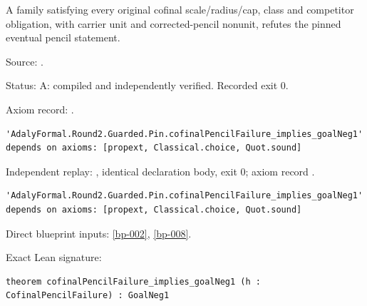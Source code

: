 \begin{theorem}[bp-245]
\label{bp-245}
\leanok
A family satisfying every original cofinal scale/radius/cap, class and competitor obligation, with carrier unit and corrected-pencil nonunit, refutes the pinned eventual pencil statement.

\par Source: \texttt{}.
\par Status: A: compiled and independently verified. Recorded exit 0.
\par Axiom record: \texttt{}.
\begin{verbatim}
'AdalyFormal.Round2.Guarded.Pin.cofinalPencilFailure_implies_goalNeg1' depends on axioms: [propext, Classical.choice, Quot.sound]
\end{verbatim}
\par Independent replay: \texttt{}, identical declaration body, exit 0; axiom record \texttt{}.
\begin{verbatim}
'AdalyFormal.Round2.Guarded.Pin.cofinalPencilFailure_implies_goalNeg1' depends on axioms: [propext, Classical.choice, Quot.sound]
\end{verbatim}
\par Direct blueprint inputs: \ref{bp-002}, \ref{bp-008}.
\par Exact Lean signature:
\begin{verbatim}
theorem cofinalPencilFailure_implies_goalNeg1 (h : CofinalPencilFailure) : GoalNeg1
\end{verbatim}
\end{theorem}


